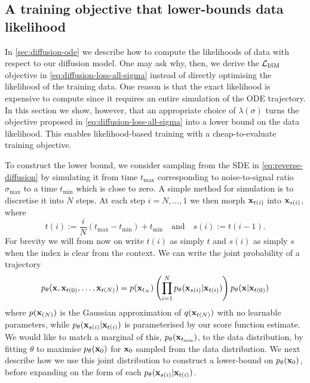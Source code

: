 \subsection{A training objective that lower-bounds data likelihood} \label{sec:diffusion-likelihood}
In \cref{sec:diffusion-ode} we describe how to compute the likelihoods of data with respect to our diffusion model. One may ask why, then, we derive the ${\mathcal{L}}_\text{ISM}$ objective in \cref{eq:diffusion-loss-all-sigma} instead of directly optimising the likelihood of the training data. One reason is that the exact likelihood is expensive to compute since it requires an entire simulation of the ODE trajectory. In this section we show, however, that an appropriate choice of $\lambda(\sigma)$ turns the objective proposed in \cref{eq:diffusion-loss-all-sigma} into a lower bound on the data likelihood. This enables likelihood-based training with a cheap-to-evaluate training objective.

To construct the lower bound, we consider sampling from the SDE in \cref{eq:reverse-diffusion} by simulating it from time $t_\text{max}$ corresponding to noise-to-signal ratio $\sigma_\text{max}$ to a time $t_\text{min}$ which is close to zero.
A simple method for simulation is to discretise it into $N$ steps. At each step $i = N,\ldots,1$ we then morph ${\mathbf{x}}_{t(i)}$ into ${\mathbf{x}}_{s(i)}$, where
\begin{equation}\nonumber
t(i) := \frac{i}{N} (t_\text{max} - t_\text{min}) + t_\text{min} \quad \text{and} \quad s(i) := t(i-1).
\end{equation}
For brevity we will from now on write $t(i)$ as simply $t$ and $s(i)$ as simply $s$ when the index is clear from the context. We can write the joint probability of a trajectory
\begin{align} \label{eq:diffusion-reverse-joint-prob}
    p_\theta({\mathbf{x}},{\mathbf{x}}_{t(0)},\ldots,{\mathbf{x}}_{t(N)}) = p({\mathbf{x}}_{t_N}) \left( \prod_{i=1}^N p_\theta({\mathbf{x}}_{s(i)} | {\mathbf{x}}_{t(i)}) \right) p_\theta({\mathbf{x}}|{\mathbf{x}}_{t(0)})
\end{align}
where $p({\mathbf{x}}_{(N)})$ is the Gaussian approximation of $q({\mathbf{x}}_{t(N)})$ with no learnable parameters, while $p_\theta({\mathbf{x}}_{s(i)} | {\mathbf{x}}_{t(i)})$ is parameterised by our score function estimate. We would like to match a marginal of this, $p_\theta({\mathbf{x}}_{t_\text{min}})$, to the data distribution, by fitting $\theta$ to maximise $p_\theta({\mathbf{x}}_0)$ for ${\mathbf{x}}_0$ sampled from the data distribution. We next describe how we use this joint distribution to construct a lower-bound on $p_\theta({\mathbf{x}}_0)$, before expanding on the form of each $p_\theta({\mathbf{x}}_{s(i)}|{\mathbf{x}}_{t(i)})$.

